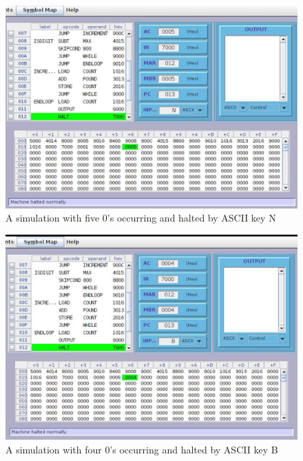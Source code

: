 \documentclass{article}
\begin{document}
	\begin{figure}[ht!]
\centering
\includegraphics[width=120mm]{sim.jpg}
\caption{A simulation with five 0's occurring and halted by ASCII key N \label{overflow}}
\end{figure}
	
\begin{figure}[ht!]
\centering
\includegraphics[width=120mm]{sim2.jpg}
\caption{A simulation with four 0's occurring and halted by ASCII key B \label{overflow}}
\end{figure}
\end{document}
